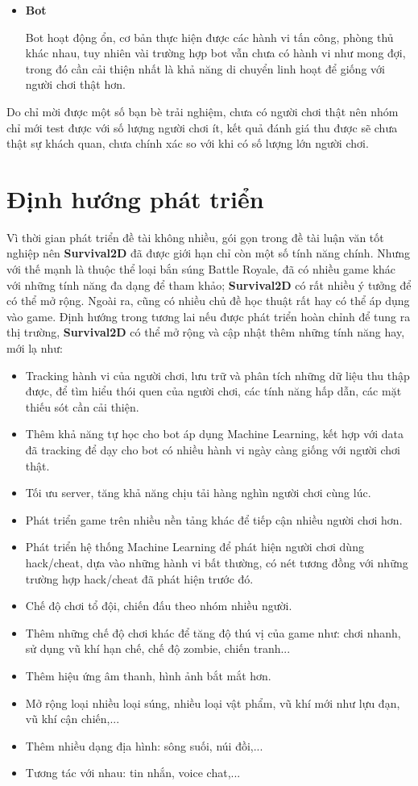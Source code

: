 \documentclass[12pt,a4paper]{article}
\begin{document}
\begin{itemize}
      \item \textbf{Bot}
      
      Bot hoạt động ổn, cơ bản thực hiện được các hành vi tấn công, phòng thủ khác nhau, tuy nhiên vài trường hợp bot vẫn chưa có hành vi như mong đợi, trong đó cần cải thiện nhất là khả năng di chuyển linh hoạt để giống với người chơi thật hơn.
      
  \end{itemize}

    Do chỉ mời được một số bạn bè trải nghiệm, chưa có người chơi thật nên nhóm chỉ mới test được với số lượng người chơi ít, kết quả đánh giá thu được sẽ chưa thật sự khách quan, chưa chính xác so với khi có số lượng lớn người chơi.

  \newpage
  \section{Định hướng phát triển}
  Vì thời gian phát triển đề tài không nhiều, gói gọn trong đề tài luận văn tốt nghiệp nên \textbf{Survival2D} đã được giới hạn chỉ còn một số tính năng chính. Nhưng với thế mạnh là thuộc thể loại bắn súng Battle Royale, đã có nhiều game khác với những tính năng đa dạng để tham khảo; \textbf{Survival2D} có rất nhiều ý tưởng để có thể mở rộng. Ngoài ra, cũng có nhiều chủ đề học thuật rất hay có thể áp dụng vào game. Định hướng trong tương lai nếu được phát triển hoàn chỉnh để tung ra thị trường, \textbf{Survival2D} có thể mở rộng và cập nhật thêm những tính năng hay, mới lạ như:
  \begin{itemize}
      \item Tracking hành vi của người chơi, lưu trữ và phân tích những dữ liệu thu thập được, để tìm hiểu thói quen của người chơi, các tính năng hấp dẫn, các mặt thiếu sót cần cải thiện.
      \item Thêm khả năng tự học cho bot áp dụng Machine Learning, kết hợp với data đã tracking để dạy cho bot có nhiều hành vi ngày càng giống với người chơi thật.
      \item Tối ưu server, tăng khả năng chịu tải hàng nghìn người chơi cùng lúc.
      \item Phát triển game trên nhiều nền tảng khác để tiếp cận nhiều người chơi hơn.
      \item Phát triển hệ thống Machine Learning để phát hiện người chơi dùng hack/cheat, dựa vào những hành vi bất thường, có nét tương đồng với những trường hợp hack/cheat đã phát hiện trước đó.
      \item Chế độ chơi tổ đội, chiến đấu theo nhóm nhiều người.
      \item Thêm những chế độ chơi khác để tăng độ thú vị của game như: chơi nhanh, sử dụng vũ khí hạn chế, chế độ zombie, chiến tranh...
      \item Thêm hiệu ứng âm thanh, hình ảnh bắt mắt hơn.
      \item Mở rộng loại nhiều loại súng, nhiều loại vật phẩm, vũ khí mới như lựu đạn, vũ khí cận chiến,...
      \item Thêm nhiều dạng địa hình: sông suối, núi đồi,...
      \item Tương tác với nhau: tin nhắn, voice chat,...
  \end{itemize}
  
\end{document}
